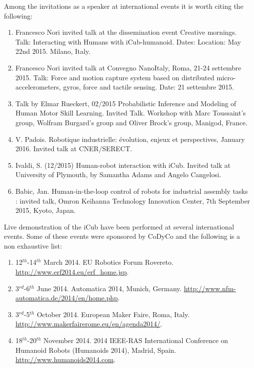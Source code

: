 \documentclass[12pt,a4paper,twoside]{article}
\begin{document}
Among the invitations as a speaker at international events it is worth citing the following:

\begin{enumerate}

\item Francesco Nori invited talk at the dissemination event Creative mornings. Talk: Interacting with Humans with iCub-humanoid. Dates: Location: May 22nd 2015. Milano, Italy.

\item Francesco Nori invited talk at Convegno NanoItaly, Roma, 21-24 settembre 2015. Talk: Force and motion capture system
based on distributed micro-accelerometers, gyros, force and tactile sensing. Date: 21 settembre 2015.

\item Talk by Elmar Rueckert, 02/2015 Probabilistic Inference and Modeling of Human Motor Skill Learning. Invited Talk. Workshop with Marc Toussaint’s group, Wolfram Burgard's group and Oliver Brock's group, Manigod, France.

\item  V. Padois. Robotique industrielle: \'evolution, enjeux et perspectives, January 2016. Invited talk at CNER/SERECT.

\item  Ivaldi, S. (12/2015) Human-robot interaction with iCub. Invited talk at University of Plymouth, by Samantha Adams and Angelo Cangelosi.

\item Babic, Jan. Human-in-the-loop control of robots for industrial assembly tasks : invited talk, Omron Keihanna Technology Innovation Center, 7th September 2015, Kyoto, Japan.

\end{enumerate} 

Live demonstration of the iCub have been performed at several international events.  Some of these events were sponsored by CoDyCo and the following is a non exhaustive list:

\begin{enumerate}

\item 12$^{th}$-14$^{th}$ March 2014. EU Robotics Forum Rovereto. \url{http://www.erf2014.eu/erf_home.jsp}.
\item 3$^{rd}$-6$^{th}$ June 2014. Automatica 2014, Munich, Germany. \url{http://www.nfm-automatica.de/2014/en/home.php}.
\item 3$^{rd}$-5$^{th}$ October 2014. European Maker Faire, Roma, Italy. \url{http://www.makerfairerome.eu/en/agenda2014/}. 
\item 18$^{th}$-20$^{th}$ November 2014. 2014 IEEE-RAS International Conference on Humanoid Robots (Humanoids 2014), Madrid, Spain. \url{http://www.humanoids2014.com}.

\end{enumerate} 
\end{document}
